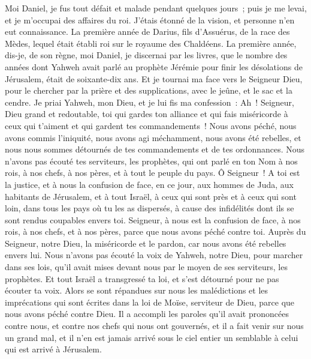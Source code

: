 \begin{multicols}{2}
Moi Daniel, je fus tout défait et malade pendant quelques jours~; puis je me levai, et je m'occupai des affaires du roi. J'étais étonné de la vision, et personne n'en eut connaissance.
\VerseOne{}La première année de Darius, fils d'Assuérus, de la race des Mèdes, lequel était établi roi sur le royaume des Chaldéens.
La première année, dis-je, de son règne, moi Daniel, je discernai par les livres, que le nombre des années dont Yahweh avait parlé au prophète Jérémie pour finir les désolations de Jérusalem, était de soixante-dix ans. 
Et je tournai ma face vers le Seigneur Dieu, pour le chercher par la prière et des supplications, avec le jeûne, et le sac et la cendre.
Je priai Yahweh, mon Dieu, et je lui fis ma confession~: Ah~! Seigneur, Dieu grand et redoutable, toi qui gardes ton alliance et qui fais miséricorde à ceux qui t'aiment et qui gardent tes commandements~!
Nous avons péché, nous avons commis l'iniquité, nous avons agi méchamment, nous avons été rebelles, et nous nous sommes détournés de tes commandements et de tes ordonnances.
Nous n'avons pas écouté tes serviteurs, les prophètes, qui ont parlé en ton Nom à nos rois, à nos chefs, à nos pères, et à tout le peuple du pays.
Ô Seigneur~! A toi est la justice, et à nous la confusion de face, en ce jour, aux hommes de Juda, aux habitants de Jérusalem, et à tout Israël, à ceux qui sont près et à ceux qui sont loin, dans tous les pays où tu les as dispersés, à cause des infidélités dont ils se sont rendus coupables envers toi.
Seigneur, à nous est la confusion de face, à nos rois, à nos chefs, et à nos pères, parce que nous avons péché contre toi.
Auprès du Seigneur, notre Dieu, la miséricorde et le pardon, car nous avons été rebelles envers lui.
Nous n'avons pas écouté la voix de Yahweh, notre Dieu, pour marcher dans ses lois, qu'il avait mises devant nous par le moyen de ses serviteurs, les prophètes.
Et tout Israël a transgressé ta loi, et s'est détourné pour ne pas écouter ta voix. Alors se sont répandues sur nous les malédictions et les imprécations qui sont écrites dans la loi de Moïse, serviteur de Dieu, parce que nous avons péché contre Dieu.
Il a accompli les paroles qu'il avait prononcées contre nous, et contre nos chefs qui nous ont gouvernés, et il a fait venir sur nous un grand mal, et il n'en est jamais arrivé sous le ciel entier un semblable à celui qui est arrivé à Jérusalem.

\end{multicols}
